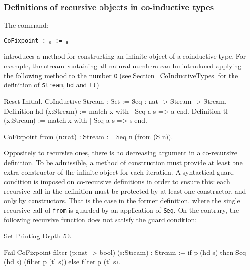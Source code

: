 \subsubsection{Definitions of recursive objects in co-inductive types}

The command:
\begin{center}
  \texttt{CoFixpoint {\ident} : \type$_0$ := \term$_0$}
  \label{CoFixpoint}
\end{center}
introduces a method for constructing an infinite object of a
coinduc\-tive type. For example, the stream containing all natural
numbers can be introduced applying the following method to the number
\texttt{O} (see Section~\ref{CoInductiveTypes} for the definition of
{\tt Stream}, {\tt hd} and {\tt tl}):
\begin{coq_eval}
Reset Initial.
CoInductive Stream : Set :=
    Seq : nat -> Stream -> Stream.
Definition hd (x:Stream) := match x with
                            | Seq a s => a
                            end.
Definition tl (x:Stream) := match x with
                            | Seq a s => s
                            end.
\end{coq_eval}
\begin{coq_example}
CoFixpoint from (n:nat) : Stream := Seq n (from (S n)).
\end{coq_example}

Oppositely to recursive ones, there is no decreasing argument in a
co-recursive definition. To be admissible, a method of construction
must provide at least one extra constructor of the infinite object for
each iteration. A syntactical guard condition is imposed on
co-recursive definitions in order to ensure this: each recursive call
in the definition must be protected by at least one constructor, and
only by constructors. That is the case in the former definition, where
the single recursive call of \texttt{from} is guarded by an
application of \texttt{Seq}. On the contrary, the following recursive
function does not satisfy the guard condition:

\begin{coq_eval}
Set Printing Depth 50.
\end{coq_eval}
\begin{coq_example}
Fail CoFixpoint filter (p:nat -> bool) (s:Stream) : Stream :=
  if p (hd s) then Seq (hd s) (filter p (tl s)) else filter p (tl s).
\end{coq_example}


